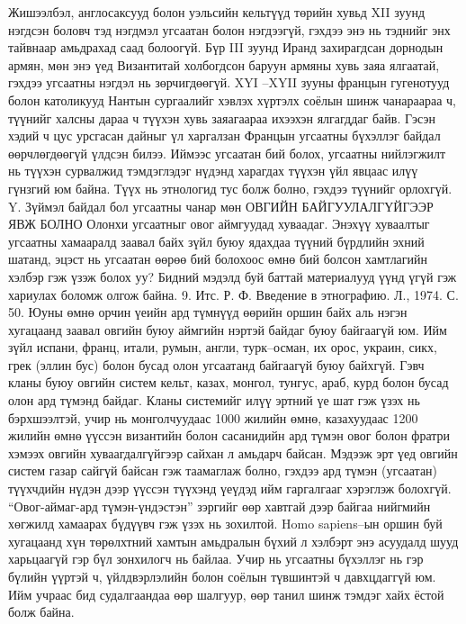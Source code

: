 Жишээлбэл, англосаксууд болон уэльсийн кельтүүд төрийн хувьд XII зуунд нэгдсэн боловч тэд нэгдмэл угсаатан болон нэгдээгүй, гэхдээ энэ нь тэднийг энх тайвнаар амьдрахад саад болоогүй. Бүр III зуунд Иранд захирагдсан дорнодын армян, мөн энэ үед Византитай холбогдсон баруун армяны хувь заяа ялгаатай, гэхдээ угсаатны нэгдэл нь зөрчигдөөгүй. XYI –XYII зууны францын гугенотууд болон католикууд Нантын сургаалийг хэвлэх хүртэлх соёлын шинж чанараараа ч, түүнийг халсны дараа ч түүхэн хувь заяагаараа ихээхэн ялгагддаг байв. Гэсэн хэдий ч цус урсгасан дайныг үл харгалзан Францын угсаатны бүхэллэг байдал өөрчлөгдөөгүй үлдсэн билээ. Иймээс угсаатан бий болох, угсаатны нийлэгжилт нь түүхэн сурвалжид тэмдэглэдэг нүдэнд харагдах түүхэн үйл явцаас илүү гүнзгий юм байна. Түүх нь этнологид тус болж болно, гэхдээ түүнийг орлохгүй.
Y. Зүймэл байдал бол угсаатны чанар мөн
ОВГИЙН БАЙГУУЛАЛГҮЙГЭЭР ЯВЖ БОЛНО
Олонхи угсаатныг овог аймгуудад хуваадаг. Энэхүү хуваалтыг угсаатны хамааралд заавал байх зүйл буюу ядахдаа түүний бүрдлийн эхний шатанд, эцэст нь угсаатан өөрөө бий болохоос өмнө бий болсон хамтлагийн хэлбэр гэж үзэж болох уу? Бидний мэдэлд буй баттай материалууд үүнд үгүй гэж хариулах боломж олгож байна. 9. Итс. Р. Ф. Введение в этнографию. Л., 1974. С. 50.
Юуны өмнө орчин үеийн ард түмнүүд өөрийн оршин байх аль нэгэн хугацаанд заавал овгийн буюу аймгийн нэртэй байдаг буюу байгаагүй юм. Ийм зүйл испани, франц, итали, румын, англи, турк–осман, их орос, украин, сикх, грек (эллин бус) болон бусад олон угсаатанд байгаагүй буюу байхгүй. Гэвч кланы буюу овгийн систем кельт, казах, монгол, тунгус, араб, курд болон бусад олон ард түмэнд байдаг.
Кланы системийг илүү эртний үе шат гэж үзэх нь бэрхшээлтэй, учир нь монголчуудаас 1000 жилийн өмнө, казахуудаас 1200 жилийн өмнө үүссэн византийн болон сасанидийн ард түмэн овог болон фратри хэмээх овгийн хуваагдалгүйгээр сайхан л амьдарч байсан. Мэдээж эрт үед овгийн систем газар сайгүй байсан гэж таамаглаж болно, гэхдээ ард түмэн (угсаатан) түүхчдийн нүдэн дээр үүссэн түүхэнд үеүдэд ийм гаргалгааг хэрэглэж болохгүй. “Овог-аймаг-ард түмэн-үндэстэн” зэргийг өөр хавтгай дээр байгаа нийгмийн хөгжилд хамаарах бүдүүвч гэж үзэх нь зохилтой. Homo sapiens–ын оршин буй хугацаанд хүн төрөлхтний хамтын амьдралын бүхий л хэлбэрт энэ асуудалд шууд харьцаагүй гэр бүл зонхилогч нь байлаа. Учир нь угсаатны бүхэллэг нь гэр бүлийн үүртэй ч, үйлдвэрлэлийн болон соёлын түвшинтэй ч давхцдаггүй юм. Ийм учраас бид судалгаандаа өөр шалгуур, өөр танил шинж тэмдэг хайх ёстой болж байна.
